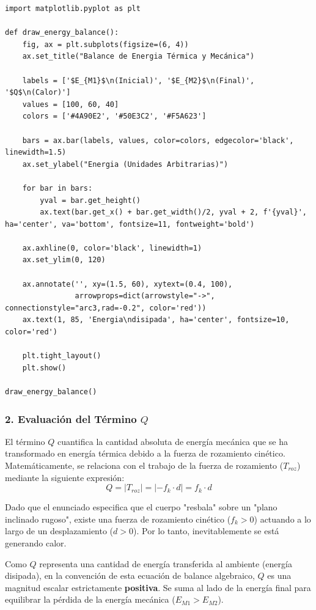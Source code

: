 \documentclass[12pt, a4paper]{article}
\begin{document}
\begin{lstlisting}
import matplotlib.pyplot as plt

def draw_energy_balance():
    fig, ax = plt.subplots(figsize=(6, 4))
    ax.set_title("Balance de Energia Térmica y Mecánica")
    
    labels = ['$E_{M1}$\n(Inicial)', '$E_{M2}$\n(Final)', '$Q$\n(Calor)']
    values = [100, 60, 40]
    colors = ['#4A90E2', '#50E3C2', '#F5A623']
    
    bars = ax.bar(labels, values, color=colors, edgecolor='black', linewidth=1.5)
    ax.set_ylabel("Energia (Unidades Arbitrarias)")
    
    for bar in bars:
        yval = bar.get_height()
        ax.text(bar.get_x() + bar.get_width()/2, yval + 2, f'{yval}', ha='center', va='bottom', fontsize=11, fontweight='bold')
        
    ax.axhline(0, color='black', linewidth=1)
    ax.set_ylim(0, 120)
    
    ax.annotate('', xy=(1.5, 60), xytext=(0.4, 100),
                arrowprops=dict(arrowstyle="->", connectionstyle="arc3,rad=-0.2", color='red'))
    ax.text(1, 85, 'Energia\ndisipada', ha='center', fontsize=10, color='red')

    plt.tight_layout()
    plt.show()

draw_energy_balance()
\end{lstlisting}

\subsubsection*{2. Evaluación del Término $Q$}
El término $Q$ cuantifica la cantidad absoluta de energía mecánica que se ha transformado en energía térmica debido a la fuerza de rozamiento cinético. Matemáticamente, se relaciona con el trabajo de la fuerza de rozamiento ($T_{roz}$) mediante la siguiente expresión:
$$Q = |T_{roz}| = |-f_k \cdot d| = f_k \cdot d$$

Dado que el enunciado especifica que el cuerpo "resbala" sobre un "plano inclinado rugoso", existe una fuerza de rozamiento cinético ($f_k > 0$) actuando a lo largo de un desplazamiento ($d > 0$). Por lo tanto, inevitablemente se está generando calor.

Como $Q$ representa una cantidad de energía transferida al ambiente (energía disipada), en la convención de esta ecuación de balance algebraico, $Q$ es una magnitud escalar estrictamente \textbf{positiva}. Se suma al lado de la energía final para equilibrar la pérdida de la energía mecánica ($E_{M1} > E_{M2}$).
\end{document}

